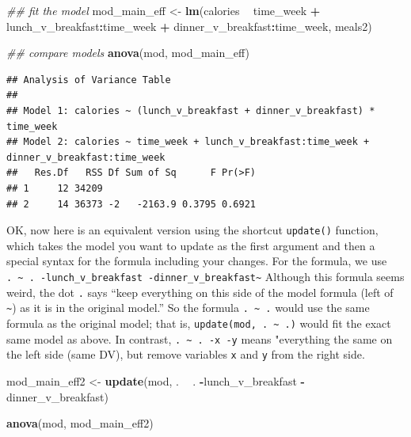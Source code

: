 \documentclass[]{book}
\newenvironment{Shaded}{\begin{snugshade}}{\end{snugshade}}
\newcommand{\CommentTok}[1]{\textcolor[rgb]{0.56,0.35,0.01}{\textit{#1}}}
\newcommand{\KeywordTok}[1]{\textcolor[rgb]{0.13,0.29,0.53}{\textbf{#1}}}
\newcommand{\NormalTok}[1]{#1}
\newcommand{\OperatorTok}[1]{\textcolor[rgb]{0.81,0.36,0.00}{\textbf{#1}}}
\newcommand{\StringTok}[1]{\textcolor[rgb]{0.31,0.60,0.02}{#1}}
\begin{document}
\begin{Shaded}
\begin{Highlighting}[]
\CommentTok{## fit the model}
\NormalTok{mod_main_eff <-}\StringTok{ }\KeywordTok{lm}\NormalTok{(calories }\OperatorTok{~}\StringTok{ }\NormalTok{time_week }\OperatorTok{+}
\StringTok{                     }\NormalTok{lunch_v_breakfast}\OperatorTok{:}\NormalTok{time_week }\OperatorTok{+}\StringTok{ }\NormalTok{dinner_v_breakfast}\OperatorTok{:}\NormalTok{time_week,}
\NormalTok{                   meals2)}

\CommentTok{## compare models}
\KeywordTok{anova}\NormalTok{(mod, mod_main_eff)}
\end{Highlighting}
\end{Shaded}

\begin{verbatim}
## Analysis of Variance Table
## 
## Model 1: calories ~ (lunch_v_breakfast + dinner_v_breakfast) * time_week
## Model 2: calories ~ time_week + lunch_v_breakfast:time_week + dinner_v_breakfast:time_week
##   Res.Df   RSS Df Sum of Sq      F Pr(>F)
## 1     12 34209                           
## 2     14 36373 -2   -2163.9 0.3795 0.6921
\end{verbatim}

OK, now here is an equivalent version using the shortcut \texttt{update()} function, which takes the model you want to update as the first argument and then a special syntax for the formula including your changes. For the formula, we use \texttt{.\ \textasciitilde{}\ .\ -lunch\_v\_breakfast\ -dinner\_v\_breakfast\textasciitilde{}} Although this formula seems weird, the dot \texttt{.} says ``keep everything on this side of the model formula (left of \texttt{\textasciitilde{}}) as it is in the original model.'' So the formula \texttt{.\ \textasciitilde{}\ .} would use the same formula as the original model; that is, \texttt{update(mod,\ .\ \textasciitilde{}\ .)} would fit the exact same model as above. In contrast, \texttt{.\ \textasciitilde{}\ .\ -x\ -y} means "everything the same on the left side (same DV), but remove variables \texttt{x} and \texttt{y} from the right side.

\begin{Shaded}
\begin{Highlighting}[]
\NormalTok{mod_main_eff2 <-}\StringTok{ }\KeywordTok{update}\NormalTok{(mod, . }\OperatorTok{~}\StringTok{ }\NormalTok{. }\OperatorTok{-}\NormalTok{lunch_v_breakfast }\OperatorTok{-}\NormalTok{dinner_v_breakfast)}

\KeywordTok{anova}\NormalTok{(mod, mod_main_eff2)}
\end{Highlighting}
\end{Shaded}
\end{document}
